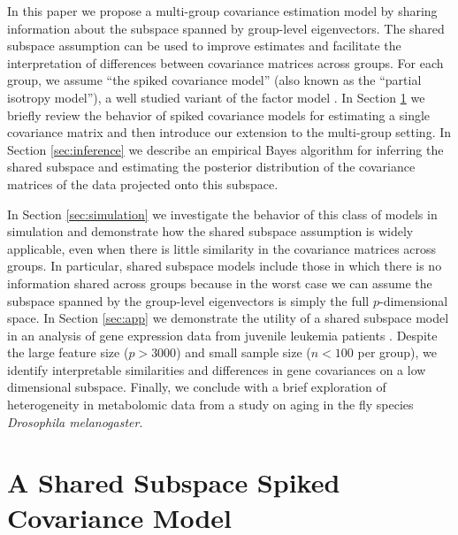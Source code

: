 \documentclass[12pt]{article}
\begin{document}
In this paper we propose a multi-group covariance estimation model by
sharing information about the subspace spanned by group-level
eigenvectors.  The shared subspace assumption can be used to improve
estimates and facilitate the interpretation of differences between
covariance matrices across groups.  For each group, we assume ``the
spiked covariance model'' (also known as the ``partial isotropy
model''), a well studied variant of the factor model
\citep{Mardia1980, Johnstone2001}.  In Section \ref{sec:shared} we
briefly review the behavior of spiked covariance models for estimating
a single covariance matrix and then introduce our extension to the
multi-group setting.  In Section \ref{sec:inference} we describe an
empirical Bayes algorithm for inferring the shared subspace and
estimating the posterior distribution of the covariance matrices of
the data projected onto this subspace.  

In Section \ref{sec:simulation} we investigate the behavior of this
class of models in simulation and demonstrate how the shared subspace
assumption is widely applicable, even when there is little similarity
in the covariance matrices across groups.  In particular, shared
subspace models include those in which there is no information shared
across groups because in the worst case we can assume the subspace
spanned by the group-level eigenvectors is simply the full
$p$-dimensional space.  In Section \ref{sec:app} we demonstrate the
utility of a shared subspace model in an analysis of gene expression
data from juvenile leukemia patients .  Despite the large feature size
($p > 3000$) and small sample size ($n < 100$ per group), we identify
interpretable similarities and differences in gene covariances on a
low dimensional subspace.  Finally, we conclude with a brief
exploration of heterogeneity in metabolomic data from a study on aging
in the fly species \textit{Drosophila melanogaster}.

\section{A Shared Subspace Spiked Covariance Model}
\label{sec:shared}

\end{document}
